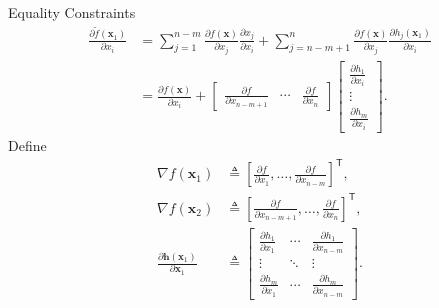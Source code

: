 \documentclass[aspectratio=169,hyperref,UTF8,CJK]{beamer}
\newcommand{\trans}{\mathsf{T}}
\newcommand{\vect}[1]{\boldsymbol{#1}}
\begin{document}
\begin{frame}{Equality Constraints}
  \scriptsize
  \begin{align*}
    \frac{\partial\widetilde f(\vect{x}_1)}{\partial x_i}
    &=\sum_{j=1}^{n-m}\frac{\partial f(\vect{x})}{\partial x_j}\frac{\partial x_j}{\partial x_i}
      +\sum_{j=n-m+1}^{n}\frac{\partial f(\vect{x})}{\partial x_j}\frac{\partial h_j(\vect{x}_1)}{\partial x_i}\\
    &=\frac{\partial f(\vect{x})}{\partial x_i}
      +\begin{bmatrix}\frac{\partial f}{\partial x_{n-m+1}}&\cdots&\frac{\partial f}{\partial x_n}\end{bmatrix}
      \begin{bmatrix}\frac{\partial h_1}{\partial x_i}\\\vdots\\\frac{\partial h_m}{\partial x_i}\end{bmatrix}.
  \end{align*}
  Define
  \begin{align*}
    \nabla f(\vect{x}_1)&\triangleq
      \left[\frac{\partial f}{\partial x_1},\ldots,
      \frac{\partial f}{\partial x_{n-m}}\right]^{\trans},\\
    \nabla f(\vect{x}_2)&\triangleq
      \left[\frac{\partial f}{\partial x_{n-m+1}},\ldots,
      \frac{\partial f}{\partial x_n}\right]^{\trans},\\
    \frac{\partial\vect{h}(\vect{x}_1)}{\partial\vect{x}_1}&\triangleq
      \begin{bmatrix}
      \frac{\partial h_1}{\partial x_1}&\cdots&\frac{\partial h_1}{\partial x_{n-m}}\\
      \vdots&\ddots&\vdots\\
      \frac{\partial h_m}{\partial x_1}&\cdots&\frac{\partial h_m}{\partial x_{n-m}}
      \end{bmatrix}.
  \end{align*}
\end{frame}
\end{document}
